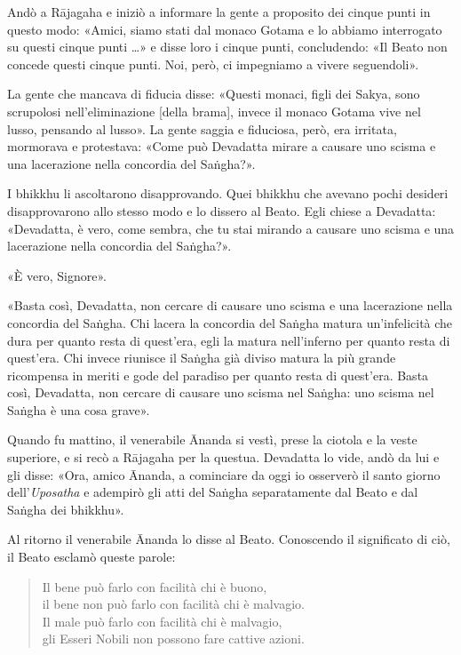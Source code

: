 Andò a Rājagaha e iniziò a informare la gente a proposito dei cinque punti in
questo modo: «Amici, siamo stati dal monaco Gotama e lo abbiamo interrogato su
questi cinque punti …» e disse loro i cinque punti, concludendo: «Il Beato non
concede questi cinque punti. Noi, però, ci impegniamo a vivere seguendoli».

La gente che mancava di fiducia disse: «Questi monaci, figli dei Sakya, sono
scrupolosi nell’eliminazione [della brama], invece il monaco Gotama vive nel
lusso, pensando al lusso». La gente saggia e fiduciosa, però, era irritata,
mormorava e protestava: «Come può Devadatta mirare a causare uno scisma e una
lacerazione nella concordia del Saṅgha?».

I bhikkhu li ascoltarono disapprovando. Quei bhikkhu che avevano pochi desideri
disapprovarono allo stesso modo e lo dissero al Beato. Egli chiese a Devadatta:
«Devadatta, è vero, come sembra, che tu stai mirando a causare uno scisma e una
lacerazione nella concordia del Saṅgha?».

«È vero, Signore».

«Basta così, Devadatta, non cercare di causare uno scisma e una lacerazione
nella concordia del Saṅgha. Chi lacera la concordia del Saṅgha matura
un’infelicità che dura per quanto resta di quest’era, egli la matura
nell’inferno per quanto resta di quest’era. Chi invece riunisce il Saṅgha già
diviso matura la più grande ricompensa in meriti e gode del paradiso per quanto
resta di quest’era. Basta così, Devadatta, non cercare di causare uno scisma nel
Saṅgha: uno scisma nel Saṅgha è una cosa grave».


Quando fu mattino, il venerabile Ānanda si vestì, prese la ciotola e la veste
superiore, e si recò a Rājagaha per la questua. Devadatta lo vide, andò da lui e
gli disse: «Ora, amico Ānanda, a cominciare da oggi io osserverò il santo giorno
dell’\emph{Uposatha} e adempirò gli atti del Saṅgha separatamente dal Beato e
dal Saṅgha dei bhikkhu».

Al ritorno il venerabile Ānanda lo disse al Beato. Conoscendo il significato di
ciò, il Beato esclamò queste parole:

\begin{quote}
Il bene può farlo con facilità chi è buono, \\
il bene non può farlo con facilità chi è malvagio. \\
Il male può farlo con facilità chi è malvagio, \\
gli Esseri Nobili non possono fare cattive azioni.
\end{quote}

